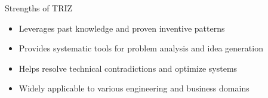 \documentclass[final]{beamer}
\begin{document}
\begin{frame}{}
\begin{columns}[t]
\begin{column}{.35\linewidth}
			\begin{block}{Strengths of TRIZ}
				\begin{itemize}
					\item Leverages past knowledge and proven inventive patterns
					\item Provides systematic tools for problem analysis and idea generation
					\item Helps resolve technical contradictions and optimize systems
					\item Widely applicable to various engineering and business domains
				\end{itemize}
			\end{block}


		\end{column}

		\begin{column}{.3\linewidth}


\end{column}
\end{columns}
\end{frame}
\end{document}
